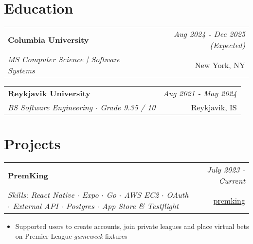 \documentclass{article}
\makeatletter
\newcommand{\resumeSubheading}[4]{
\vspace{0.5mm}
    \begin{tabular*}{0.98\textwidth}[t]{l@{\extracolsep{\fill}}r}
		\textbf{\normalsize{#1}} & \textit{\footnotesize{#4}} \\
        \textit{\footnotesize{#3}} &  \footnotesize{#2}\\
    \end{tabular*}
    \vspace{-2.4mm}
}
\newcommand{\resumeProject}[4]{
\vspace{0.5mm}
    \begin{tabular*}{0.98\textwidth}[t]{l@{\extracolsep{\fill}}r}
        \textbf{#1} & \textit{\footnotesize{#3}} \\
        \footnotesize{\textit{#2}} & \footnotesize{#4}
    \end{tabular*}
    \vspace{-2.4mm}
}
\newcommand{\resumeSubHeadingListStart}{}
\newcommand{\resumeItemListStart}{\begin{itemize}[leftmargin=*,labelsep=1mm,itemsep=0.5mm]\normalsize}
\newcommand{\resumeSubHeadingListEnd}{}
\newcommand{\resumeItemListEnd}{\end{itemize}\vspace{-2mm}}
\newcommand{\socialicon}[1]{\raisebox{-0.05em}{\resizebox{!}{1em}{#1}}}
\makeatother
\begin{document}
  \resumeSubHeadingListEnd
\vspace{-4mm}

\section{\textbf{Education}}
\vspace{-0.4mm}
\resumeSubHeadingListStart

\resumeSubheading
{Columbia University}{New York, NY}
{MS Computer Science | Software Systems}{Aug 2024 - Dec 2025 (Expected)}

\vspace{4mm}
\resumeSubheading
{Reykjavik University}{Reykjavik, IS}
{BS Software Engineering $\cdot$ Grade 9.35 / 10}{Aug 2021 - May 2024}




\resumeSubHeadingListEnd
\vspace{-1mm}

\section{\textbf{Projects}}
\vspace{-0.4mm}
\resumeSubHeadingListStart

\resumeProject
  {PremKing}
  {Skills: React Native $\cdot$ Expo $\cdot$ Go $\cdot$ AWS EC2 $\cdot$ OAuth $\cdot$ External API $\cdot$ Postgres $\cdot$ App Store \& Testflight}
  {July 2023 - Current}
  {\href{https://github.com/kristo-og-logi/premking}{\socialicon{\faGithub} premking}}
\resumeItemListStart
\item Supported users to create accounts, join private leagues and place virtual bets on Premier League \emph{gameweek} fixtures
\resumeItemListEnd
\end{document}
